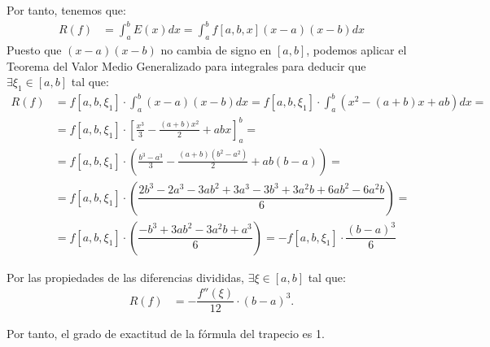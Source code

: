 \begin{ejercicio}
    Por tanto, tenemos que:
    \begin{align*}
        R(f) &= \int_{a}^{b} E(x) dx = \int_{a}^{b} f[a,b,x](x - a)(x - b) dx
    \end{align*}
    Puesto que $(x - a)(x - b)$ no cambia de signo en $[a, b]$, podemos aplicar el Teorema del Valor Medio Generalizado para integrales para deducir que $\exists \xi_1 \in [a, b]$ tal que:
    \begin{align*}
        R(f) &= f[a,b,\xi_1]\cdot \int_{a}^{b} (x - a)(x - b) dx
        = f[a,b,\xi_1]\cdot \int_{a}^{b} \left( x^2 - (a + b)x + ab \right) dx
        =\\&= f[a,b,\xi_1]\cdot \left[ \frac{x^3}{3} - \frac{(a + b)x^2}{2} + abx \right]_{a}^{b}
        =\\&= f[a,b,\xi_1]\cdot \left( \frac{b^3 - a^3}{3} - \frac{(a + b)(b^2 - a^2)}{2} + ab(b - a) \right)
        =\\&= f[a,b,\xi_1]\cdot \left( \dfrac{2b^3-2a^3-3ab^2+3a^3-3b^3+3a^2b+6ab^2-6a^2b}{6} \right)
        =\\&= f[a,b,\xi_1]\cdot \left( \dfrac{-b^3 +3ab^2 - 3a^2b + a^3}{6} \right)
        = - f[a,b,\xi_1]\cdot \dfrac{(b - a)^3}{6}
    \end{align*}

    Por las propiedades de las diferencias divididas, $\exists \xi \in [a, b]$ tal que:
    \begin{align*}
        R(f) &= -\dfrac{f''(\xi)}{12} \cdot (b - a)^3.
    \end{align*}

    Por tanto, el grado de exactitud de la fórmula del trapecio es 1.
\end{ejercicio}

